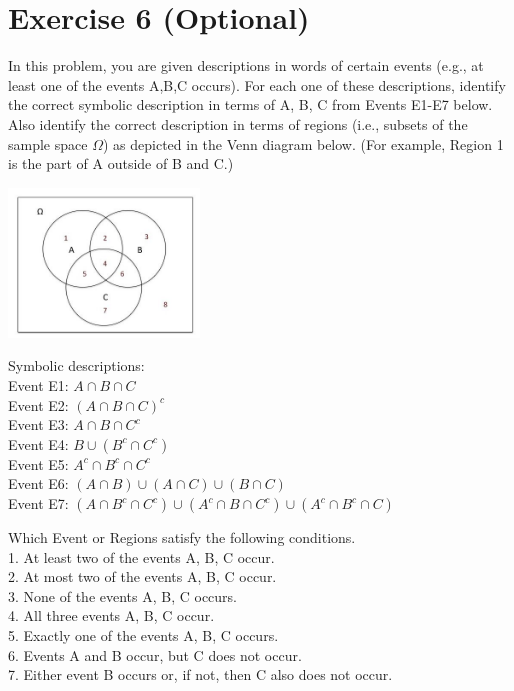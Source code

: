 \documentclass[12pt,thmsa]{article}\usepackage[]{graphicx}\usepackage[]{color}
\begin{document}
\section*{Exercise 6 (Optional)}
In this problem, you are given descriptions in words of certain events (e.g., at least one of the events A,B,C occurs). For each one of these descriptions, identify the correct symbolic description in terms of A, B, C from Events E1-E7 below. Also identify the correct description in terms of regions (i.e., subsets of the sample space $\Omega$) as depicted in the Venn diagram below. (For example, Region 1 is the part of A outside of B and C.)
\begin{center}
\includegraphics[width = 2in]{images1.jpg}
\end{center}

\noindent Symbolic descriptions: \\
Event E1: $A \cap B \cap C$ \\
Event E2: $(A\cap B \cap C)^c $ \\
Event E3: $ A \cap B \cap C^c $ \\
Event E4: $B \cup (B^c \cap C^c)$ \\
Event E5: $A^c \cap B^c \cap C^c $ \\
Event E6: $(A \cap B) \cup (A \cap C) \cup (B \cap C)$ \\
Event E7: $(A \cap B^c \cap C^c) \cup (A^c \cap B \cap C^c) \cup (A^c \cap B^c \cap C) $

\noindent Which Event or Regions satisfy the following conditions. \\
1. At least two of the events A, B, C occur. \\
2. At most two of the events A, B, C occur. \\
3. None of the events A, B, C occurs. \\
4. All three events A, B, C occur. \\
5. Exactly one of the events A, B, C occurs.\\
6. Events A and B occur, but C does not occur. \\
7. Either event B occurs or, if not, then C also does not occur.
\end{document}
